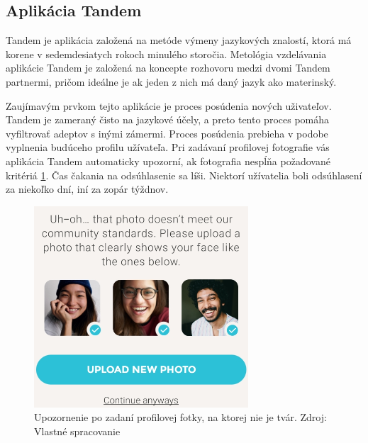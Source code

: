 \documentclass[10pt,oneside,slovak,a4paper]{article}
\begin{document}
\subsection{Aplikácia Tandem} %
Tandem je aplikácia založená na metóde výmeny jazykových znalostí, ktorá má korene v sedemdesiatych rokoch minulého storočia. Metológia vzdelávania aplikácie Tandem je založená na koncepte rozhovoru medzi dvomi Tandem partnermi, pričom ideálne je ak jeden z nich má daný jazyk ako materinský.

Zaujímavým prvkom tejto aplikácie je proces posúdenia nových uživateľov.\cite{tandem} Tandem je zameraný čisto na jazykové účely, a preto tento proces pomáha vyfiltrovať adeptov s inými zámermi. Proces posúdenia prebieha v podobe vyplnenia budúceho profilu užívateľa. Pri zadávaní profilovej fotografie vás aplikácia Tandem automaticky upozorní, ak fotografia nespĺňa požadované kritériá \ref{tandem-obmedzenia}. Čas čakania na odsúhlasenie sa líši. Niektorí užívatelia boli odsúhlasení za niekoľko dní, iní za zopár týždnov.

\begin{figure}[h] %
\centering
\includegraphics{tandem2.png}
\caption{Upozornenie po zadaní profilovej fotky, na ktorej nie je tvár. Zdroj: Vlastné spracovanie}
\label{tandem-obmedzenia}
\end{figure}
\end{document}
